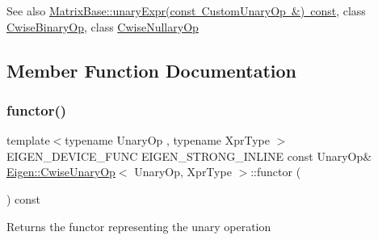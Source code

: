 \begin{DoxySeeAlso}{See also}
\mbox{\hyperlink{class_eigen_1_1_matrix_base_a03db69599e5dc10f9b7524bbdd0bdcbb}{Matrix\+Base\+::unary\+Expr(const Custom\+Unary\+Op \&) const}}, class \mbox{\hyperlink{class_eigen_1_1_cwise_binary_op}{Cwise\+Binary\+Op}}, class \mbox{\hyperlink{class_eigen_1_1_cwise_nullary_op}{Cwise\+Nullary\+Op}} 
\end{DoxySeeAlso}


\subsection{Member Function Documentation}
\mbox{\label{class_eigen_1_1_cwise_unary_op_ac02eff03893317021760f7d093c4ab9d}} 
\subsubsection{\texorpdfstring{functor()}{functor()}}
{\footnotesize\ttfamily template$<$typename Unary\+Op , typename Xpr\+Type $>$ \\
E\+I\+G\+E\+N\+\_\+\+D\+E\+V\+I\+C\+E\+\_\+\+F\+U\+NC E\+I\+G\+E\+N\+\_\+\+S\+T\+R\+O\+N\+G\+\_\+\+I\+N\+L\+I\+NE const Unary\+Op\& \mbox{\hyperlink{class_eigen_1_1_cwise_unary_op}{Eigen\+::\+Cwise\+Unary\+Op}}$<$ Unary\+Op, Xpr\+Type $>$\+::functor (\begin{DoxyParamCaption}{ }\end{DoxyParamCaption}) const\hspace{0.3cm}{\ttfamily [inline]}}

\begin{DoxyReturn}{Returns}
the functor representing the unary operation 
\end{DoxyReturn}
\mbox{\label{class_eigen_1_1_cwise_unary_op_a25d4402be360cf0b8ff867863da46c7d}} 
